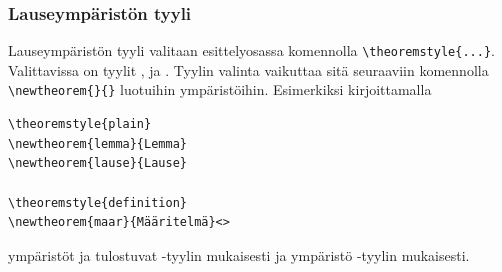 \begin{frame}[fragile]
    
    
\end{frame}


\begin{frame}[fragile]
    \frametitle{Lauseympäristön tyyli}
    Lauseympäristön tyyli valitaan esittelyosassa komennolla \lstinline-\theoremstyle{...}-. Valittavissa on tyylit ,  ja . Tyylin valinta vaikuttaa sitä seuraaviin komennolla \lstinline-\newtheorem{}{}- luotuihin ympäristöihin.
    \vaihto
    Esimerkiksi kirjoittamalla
    \pause
    \begin{lstlisting}
\theoremstyle{plain}
\newtheorem{lemma}{Lemma}
\newtheorem{lause}{Lause}

\theoremstyle{definition}
\newtheorem{maar}{Määritelmä}<>
    \end{lstlisting}
    \pause
    ympäristöt  ja  tulostuvat -tyylin mukaisesti ja ympäristö  -tyylin mukaisesti.
\end{frame}

